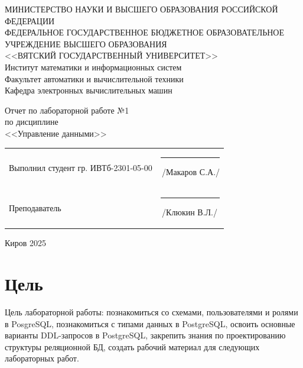 \documentclass[a4paper,14pt]{extarticle}
\begin{document}
  \newpage\thispagestyle{empty}
  \begin{center}
    \MakeUppercase{
      Министерство науки и высшего образования Российской Федерации\\
      Федеральное государственное бюджетное образовательное учреждение высшего образования\\
      <<Вятский Государственный Университет>>\\
    }
    Институт математики и информационных систем\\
    Факультет автоматики и вычислительной техники\\
    Кафедра электронных вычислительных машин
  \end{center}
  \vfill

  \begin{center}
    Отчет по лабораторной работе №1\\
    по дисциплине\\
    <<Управление данными>>\\
  \end{center}
  \vfill

  \noindent
  \begin{tabular}{ll}
    Выполнил студент гр. ИВТб-2301-05-00 \hspace{5mm} &
    \rule[-1mm]{25mm}{0.10mm}\,/Макаров С.А./\\
    
    Преподаватель & \rule[-1mm]{25mm}{0.10mm}\,/Клюкин В.Л./\\
  \end{tabular}

  \vfill
  \begin{center}
    Киров 2025
  \end{center}

  \newpage
  \section*{Цель}
  Цель лабораторной работы: познакомиться со схемами, пользователями и ролями в PosgreSQL, познакомиться с типами данных в PostgreSQL, освоить основные варианты DDL-запросов в PostgreSQL, закрепить знания по проектированию структуры реляционной БД, создать рабочий материал для следующих лабораторных работ.
\end{document}

